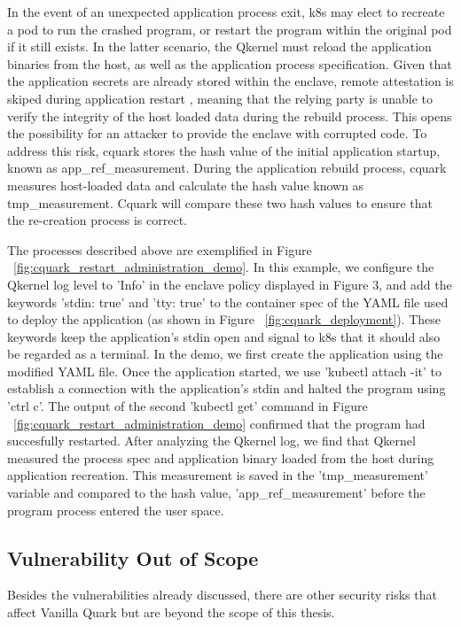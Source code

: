 In the event of an unexpected application process exit, k8s may elect to recreate a pod to run the crashed program, or restart the program within the original pod if it still exists. In the latter scenario, the Qkernel must reload the application 
binaries from the host, as well as the application process specification. Given that the application secrets are already stored within the enclave, remote attestation is skiped during application restart , meaning that the relying party is unable 
to verify the integrity of the host loaded data during the rebuild process. This opens the possibility for an attacker to provide the enclave with corrupted code. To address this risk, cquark stores the hash value of the initial application 
startup, known as app\_ref\_measurement. During the application rebuild process, cquark measures host-loaded data and calculate the hash value known as tmp\_measurement.  Cquark will compare these two hash values to ensure that the re-creation 
process is correct.

The processes described above are exemplified in Figure ~\ref{fig:cquark_restart_administration_demo}. In this example, we configure the Qkernel log level to 'Info' in the enclave policy displayed in Figure 3, and add the keywords 
'stdin: true' and 'tty: true' to the container spec of the YAML file used to deploy the application (as shown in Figure ~\ref{fig:cquark_deployment}). These keywords keep the application's stdin open and signal to k8s that it should also 
be regarded as a terminal. In the demo, we first create the application using the modified YAML file. Once the application started, we use 'kubectl attach -it' to establish a connection with the application's stdin and halted the program using 'ctrl c'. The output of the second 'kubectl get' command in Figure ~\ref{fig:cquark_restart_administration_demo} confirmed 
that the program had succesfully restarted. After analyzing the Qkernel log, we find that Qkernel measured the process spec and application binary loaded from the host during application recreation. This measurement is saved in the 
'tmp\_measurement' variable and compared to the hash value, 'app\_ref\_measurement' before the program process entered the user space.




\subsection{Vulnerability Out of Scope}
Besides the vulnerabilities already discussed, there are other security risks that affect Vanilla Quark but are beyond the scope of this thesis.



